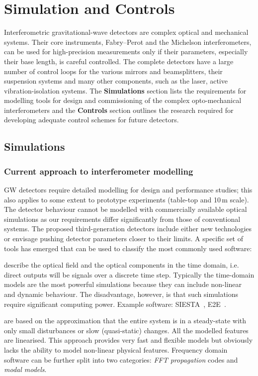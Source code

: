\chapter{Simulation and Controls}
\label{sec:Appendix_Sim_Controls}

Interferometric gravitational-wave detectors are complex optical and mechanical systems. Their core instruments, Fabry–Perot and the Michelson interferometers, can be used for high-precision measurements only if their parameters, especially their base length, is careful controlled. 
The complete detectors have a large number of control loops for the various mirrors and beamsplitters, their suspension systems and many other components, such as the laser, active vibration-isolation systems. The \textbf{Simulations} section lists the requirements for modelling tools for design and commissioning of the complex opto-mechanical interferometers and the \textbf{Controls} section outlines the research required for developing adequate control schemes for future detectors.

\section{Simulations}
\subsection{Current approach to interferometer modelling}
GW detectors require detailed modelling for design and performance studies; this also applies to some extent to prototype experiments (table-top and 10\,m scale). The detector behaviour cannot be modelled with commercially available optical simulations as our requirements differ significantly from those of conventional systems. The proposed third-generation detectors include either new technologies or envisage pushing detector parameters closer to their limits. 
A specific set of tools has emerged that can be used to classify the most commonly used software:

 describe the optical field and the optical components in the time domain, i.e. direct outputs will be signals over a discrete time step. Typically the time-domain models are the most powerful   simulations because they can include non-linear and dynamic behaviour.
The disadvantage, however, is that such simulations require significant computing power. Example software: SIESTA~\cite{SIESTA}, E2E~\cite{e2e_2000}.

 are based on the approximation that the entire system is in a steady-state with only small disturbances or slow (quasi-static) changes. All the modelled features are linearised.
This approach provides very fast and flexible models but obviously lacks the ability to model non-linear physical features. Frequency domain software can be further split
into two categories: \emph{FFT propagation} codes and \emph{modal models}.

